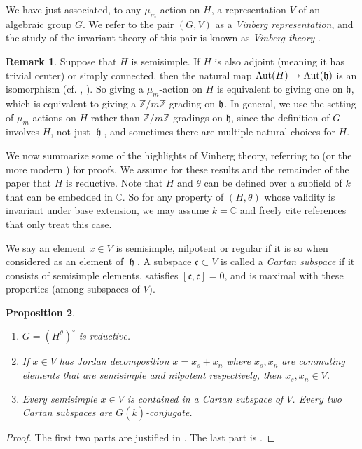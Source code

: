 \documentclass{article} %
\newtheorem{proposition}{Proposition}[section]
\numberwithin{equation}{section}
\theoremstyle{definition}
\newtheorem{remark}[proposition]{Remark}
\DeclareMathOperator{\lieh}{\mathfrak{h}}
\DeclareMathOperator{\Aut}{Aut}
\newcommand{\Z}{\mathbb{Z}}
\newcommand{\frakh}{\mathfrak h}
\begin{document}
We have just associated, to any $\mu_m$-action on $H$, a representation $V$ of an algebraic group $G$.
We refer to the pair $(G,V)$ as a \emph{Vinberg representation}, and the study of the invariant theory of this pair is known as \emph{Vinberg theory} \cite{Vinberg-theweylgroupofgraded}.

\begin{remark}
    Suppose that $H$ is semisimple.
    If $H$ is also adjoint (meaning it has trivial center) or simply connected, then the natural map $\Aut(H) \rightarrow \Aut(\frak{h})$ is an isomorphism (cf. \cite[Section 1.5]{Conrad-SGA}, \cite[Section 3.1]{Reeder-torsion}).
    So giving a $\mu_m$-action on $H$ is equivalent to giving one on $\frakh$, which is equivalent to giving a $\Z/m\Z$-grading on $\frak{h}$.
    In general, we use the setting of $\mu_m$-actions on $H$ rather than $\Z/m\Z$-gradings on $\frakh$, since the definition of $G$ involves $H$, not just $\lieh$, and sometimes there are multiple natural choices for $H$. 
\end{remark}



We now summarize some of the highlights of Vinberg theory, referring to \cite{Vinberg-theweylgroupofgraded} (or the more modern \cite{Panyushev-Invarianttheorythetagroups,  Levy-Vinbergtheoryposchar}) for proofs.
We assume for these results and the remainder of the paper that $H$ is reductive.
Note that $H$ and $\theta$ can be defined over a subfield of $k$ that can be embedded in $\mathbb{C}$. 
So for any property of $(H, \theta)$ whose validity is invariant under base extension, we may assume $k=\mathbb{C}$ and freely cite references that only treat this case.



We say an element $x\in V$ is semisimple, nilpotent or regular if it is so when considered as an element of $\lieh$. 
A subspace $\mathfrak{c} \subset V$ is called a \emph{Cartan subspace} if it consists of semisimple elements, satisfies $[\mathfrak{c},\mathfrak{c}]=0$, and is maximal with these properties (among subspaces of $V$).


\begin{proposition}
    \begin{enumerate}
        \item $G = (H^{\theta})^{\circ}$ is reductive.
        \item If $x\in V$ has Jordan decomposition $x = x_s + x_n$ where $x_s, x_n$ are commuting elements that are semisimple and nilpotent respectively, then $x_s,x_n \in V$.
        \item Every semisimple $x\in V$ is contained in a Cartan subspace of $V$. 
Every two Cartan subspaces are $G(\bar k)$-conjugate. 
    \end{enumerate}
\end{proposition}
\begin{proof}
    The first two parts are justified in \cite[Section 1]{Vinberg-theweylgroupofgraded}.
    The last part is \cite[Section 3, Theorem 1]{Vinberg-theweylgroupofgraded}.
\end{proof}
\end{document}
